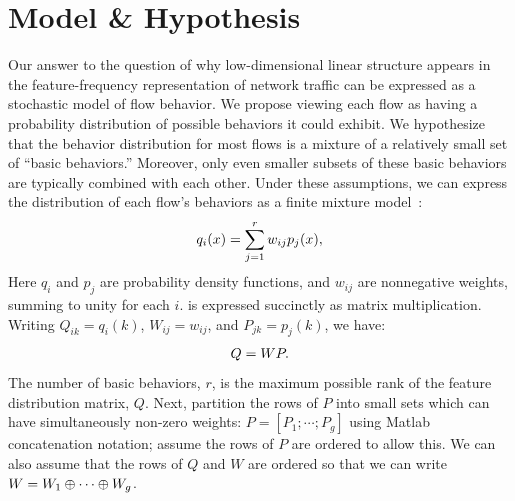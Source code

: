 \documentclass[conference]{IEEEtran}
\begin{document}
\section{Model \& Hypothesis}

Our answer to the question of why low-dimensional linear structure appears in the feature-frequency representation of network traffic can be expressed as a stochastic model of flow behavior.
We propose viewing each flow as having a probability distribution of possible behaviors it could exhibit.
We hypothesize that the behavior distribution for most flows is a mixture of a relatively small set of ``basic behaviors.''
Moreover, only even smaller subsets of these basic behaviors are typically combined with each other.
Under these assumptions, we can express the distribution of each flow's behaviors as a finite mixture model~\cite{McLachlan00}:
\begin{align}\eqn{mixture-model}
  q_i(x) = \sum_{j=1}^r w_{ij} p_j(x),
\end{align}
Here $q_i$ and $p_j$ are probability density functions, and $w_{ij}$ are nonnegative weights, summing to unity for each $i$.
 is expressed succinctly as matrix multiplication.
Writing $Q_{ik} = q_i(k)$, $W_{ij} = w_{ij}$, and $P_{jk} = p_j(k)$, we have:
\begin{align}\eqn{mixture-model-matrix}
  Q = WP.
\end{align}
The number of basic behaviors, $r$, is the maximum possible rank of the feature distribution matrix, $Q$.
Next, partition the rows of $P$ into small sets which can have simultaneously non-zero weights: $P = [P_1;\cdots;P_g]$ using Matlab concatenation notation;
assume the rows of $P$ are ordered to allow this.
We can also assume that the rows of $Q$ and $W$ are ordered so that we can write $W = W_1 \oplus \cdots \oplus W_g$.

\end{document}
